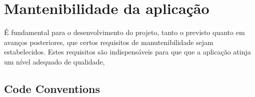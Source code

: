 \section{Mantenibilidade da aplicação}
É fundamental para o desenvolvimento do projeto, tanto o previsto
quanto em avanços posteriores, que certos requisitos de
manutenibilidade sejam estabelecidos. Estes requisitos são
indispensáveis para que que a aplicação atinja um nível adequado de
qualidade, 

\subsection{Code Conventions}
